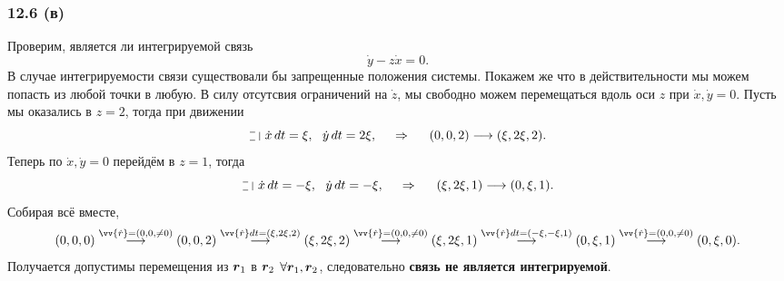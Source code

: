 \subsubsection*{12.6 (в)}

Проверим, является ли интегрируемой связь 
\begin{equation*}
    \dot{y} - z \dot{x} = 0.
\end{equation*}
В случае интегрируемости связи существовали бы запрещенные положения системы. Покажем же что в действительности мы можем попасть из любой точки в любую. В силу отсутсвия ограничений на $\dot{z}$, мы свободно можем перемещаться вдоль оси $z$ при $\dot{x}, \dot{y} = 0$. Пусть мы оказались в $z = 2$, тогда при движении
\begin{equation*}
    \letus \ \dot{x} \d t = \xi,
    \ \ \dot{y} \d t=  2 \xi, \hspace{0.5cm} \Rightarrow \hspace{0.5cm} 
    (0, 0, 2) \longrightarrow (\xi, 2 \xi, 2).
\end{equation*}
Теперь по $\dot{x}, \dot{y} = 0$ перейдём в $z = 1$, тогда
\begin{equation*}
    \letus \ \dot{x} \d t = -\xi, \ \ \dot{y} \d t = -\xi,
    \hspace{0.5cm} \Rightarrow \hspace{0.5cm} 
    (\xi, 2 \xi, 1) \longrightarrow (0, \xi, 1).
\end{equation*}
Собирая всё вместе,
\begin{equation*}
    (0, 0, 0)
    \overset{\vv{\dot{r}} = (0, 0, \neq 0)}{\longrightarrow} 
    (0, 0, 2)
    \overset{\vv{\dot{r}}dt = (\xi, 2\xi, 2)}{\longrightarrow} 
    (\xi, 2 \xi, 2)
    \overset{\vv{\dot{r}} = (0, 0, \neq 0)}{\longrightarrow} 
    (\xi, 2 \xi, 1)
    \overset{\vv{\dot{r}}dt = (-\xi, -\xi, 1)}{\longrightarrow} 
    (0, \xi, 1)
    \overset{\vv{\dot{r}} = (0, 0, \neq 0)}{\longrightarrow} 
    (0, \xi, 0).
\end{equation*}
Получается допустимы перемещения из $\mbox{\boldmath $r$}_1$ в $\mbox{\boldmath $r$}_2$ $\forall \mbox{\boldmath $r$}_1, \mbox{\boldmath $r$}_2$, следовательно \textbf{связь не является интегрируемой}.

